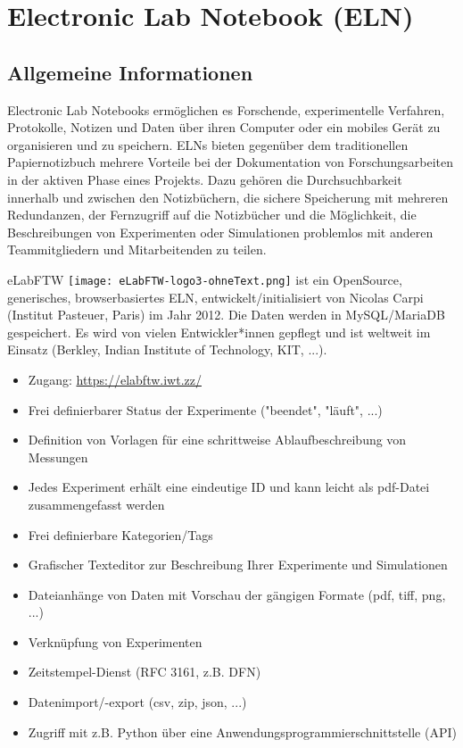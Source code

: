 \section[Electronic Lab Notebook]{Electronic Lab Notebook (ELN)}\label{ssc:ELN}

\subsection{Allgemeine Informationen}

Electronic Lab Notebooks ermöglichen es Forschende, experimentelle
Verfahren, Protokolle, Notizen und Daten über ihren Computer oder ein mobiles
Gerät zu organisieren und zu speichern. ELNs bieten gegenüber dem traditionellen
Papiernotizbuch mehrere Vorteile bei der Dokumentation von Forschungsarbeiten in
der aktiven Phase eines Projekts. Dazu gehören die Durchsuchbarkeit innerhalb
und zwischen den Notizbüchern, die sichere Speicherung mit mehreren Redundanzen,
der Fernzugriff auf die Notizbücher und die Möglichkeit, die Beschreibungen von
Experimenten oder Simulationen problemlos mit anderen Teammitgliedern und
Mitarbeitenden zu teilen.

eLabFTW \texttt{[image: eLabFTW-logo3-ohneText.png]} ist ein OpenSource, generisches, browserbasiertes ELN, entwickelt/initialisiert von Nicolas Carpi (Institut Pasteuer, Paris) im Jahr 2012. Die Daten werden in MySQL/MariaDB gespeichert. Es wird von vielen Entwickler*innen gepflegt und ist weltweit im Einsatz (Berkley, Indian Institute of Technology, KIT, ...).
\begin{itemize}
  \item Zugang: \url{https://elabftw.iwt.zz/}
  \item Frei definierbarer Status der Experimente ("beendet", "läuft", ...)
  \item Definition von Vorlagen für eine schrittweise Ablaufbeschreibung von
        Messungen
  \item Jedes Experiment erhält eine eindeutige ID und kann leicht als pdf-Datei
        zusammengefasst werden
  \item Frei definierbare Kategorien/Tags
  \item Grafischer Texteditor zur Beschreibung Ihrer Experimente und Simulationen
  \item Dateianhänge von Daten mit Vorschau der gängigen Formate (pdf, tiff,
        png, ...)
  \item Verknüpfung von Experimenten
  \item Zeitstempel-Dienst (RFC 3161, z.B. DFN)
  \item Datenimport/-export (csv, zip, json, ...)
  \item Zugriff mit z.B. Python über eine Anwendungsprogrammierschnittstelle (API)
\end{itemize}



